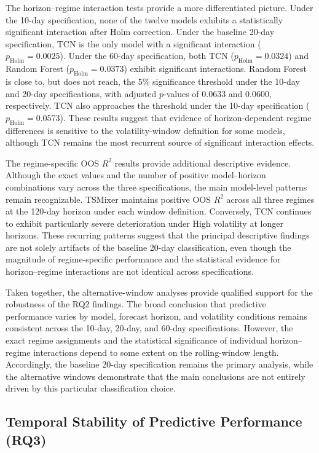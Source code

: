 \documentclass[12pt,twoside]{ord}
\makeatletter
\providecommand{\FloatBarrier}{\par\ifx\@deferlist\@empty\else\clearpage\fi}
\makeatother
\begin{document}
The horizon--regime interaction tests provide a more differentiated picture. Under the 10-day specification, none of the twelve models exhibits a statistically significant interaction after Holm correction. Under the baseline 20-day specification, TCN is the only model with a significant interaction ($p_{\mathrm{Holm}}=0.0025$). Under the 60-day specification, both TCN ($p_{\mathrm{Holm}}=0.0324$) and Random Forest ($p_{\mathrm{Holm}}=0.0373$) exhibit significant interactions. Random Forest is close to, but does not reach, the 5\% significance threshold under the 10-day and 20-day specifications, with adjusted $p$-values of 0.0633 and 0.0600, respectively. TCN also approaches the threshold under the 10-day specification ($p_{\mathrm{Holm}}=0.0573$). These results suggest that evidence of horizon-dependent regime differences is sensitive to the volatility-window definition for some models, although TCN remains the most recurrent source of significant interaction effects.

The regime-specific OOS $R^2$ results provide additional descriptive evidence. Although the exact values and the number of positive model--horizon combinations vary across the three specifications, the main model-level patterns remain recognizable. TSMixer maintains positive OOS $R^2$ across all three regimes at the 120-day horizon under each window definition. Conversely, TCN continues to exhibit particularly severe deterioration under High volatility at longer horizons. These recurring patterns suggest that the principal descriptive findings are not solely artifacts of the baseline 20-day classification, even though the magnitude of regime-specific performance and the statistical evidence for horizon--regime interactions are not identical across specifications.

Taken together, the alternative-window analyses provide qualified support for the robustness of the RQ2 findings. The broad conclusion that predictive performance varies by model, forecast horizon, and volatility conditions remains consistent across the 10-day, 20-day, and 60-day specifications. However, the exact regime assignments and the statistical significance of individual horizon--regime interactions depend to some extent on the rolling-window length. Accordingly, the baseline 20-day specification remains the primary analysis, while the alternative windows demonstrate that the main conclusions are not entirely driven by this particular classification choice.

\FloatBarrier
\subsection{Temporal Stability of Predictive Performance (RQ3)}\label{subsec:temporal_stability}
\end{document}
